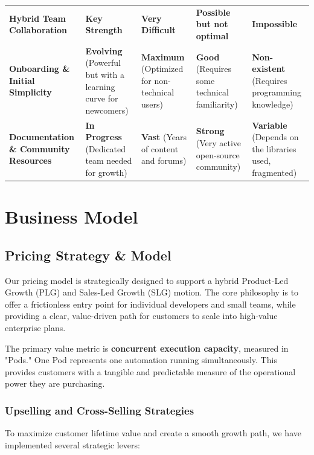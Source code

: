 \documentclass[11pt, a4paper, oneside]{article}
\begin{document}
\begin{table}[H]
{\begin{tabularx}{1.2\textwidth}{lLLLL}
\addlinespace
\textbf{Hybrid Team Collaboration} & \textbf{Key Strength} & \textbf{Very Difficult} & \textbf{Possible but not optimal} & \textbf{Impossible} \\
\addlinespace
\textbf{Onboarding \& Initial Simplicity} & \textbf{Evolving} (Powerful but with a learning curve for newcomers) & \textbf{Maximum} (Optimized for non-technical users) & \textbf{Good} (Requires some technical familiarity) & \textbf{Non-existent} (Requires programming knowledge) \\
\addlinespace
\textbf{Documentation \& Community Resources} & \textbf{In Progress} (Dedicated team needed for growth) & \textbf{Vast} (Years of content and forums) & \textbf{Strong} (Very active open-source community) & \textbf{Variable} (Depends on the libraries used, fragmented) \\
\bottomrule
\end{tabularx}%
}
\end{table}

\section{Business Model}
\subsection{Pricing Strategy \& Model}
Our pricing model is strategically designed to support a hybrid Product-Led Growth (PLG) and Sales-Led Growth (SLG) motion. The core philosophy is to offer a frictionless entry point for individual developers and small teams, while providing a clear, value-driven path for customers to scale into high-value enterprise plans.

The primary value metric is \textbf{concurrent execution capacity}, measured in "Pods." One Pod represents one automation running simultaneously. This provides customers with a tangible and predictable measure of the operational power they are purchasing.

\subsubsection{Upselling and Cross-Selling Strategies}

To maximize customer lifetime value and create a smooth growth path, we have implemented several strategic levers:
\end{document}
